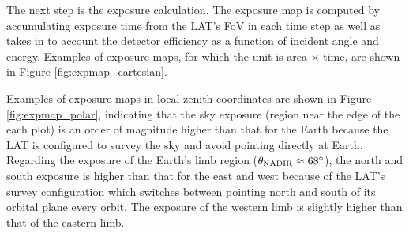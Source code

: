 The next step is the exposure calculation.
The exposure map is computed 
by accumulating exposure time from the LAT's FoV
in each time step as well as takes
in to account the detector efficiency as a function
of incident angle and energy.
Examples of exposure maps, for which the unit is area $\times$ time,
are shown in Figure \ref{fig:expmap_cartesian}.



Examples of exposure maps in local-zenith coordinates are
shown in Figure \ref{fig:expmap_polar}, indicating that the sky exposure
(region near the edge of the each plot) is an order of
magnitude higher than that for the Earth because the LAT
is configured to survey the sky and avoid pointing directly at Earth.
Regarding the exposure of the Earth's limb region
($\theta_{\rm NADIR}\approx68^\circ$), the north and south exposure
is higher than that for the east and west because of the LAT's survey
configuration which switches between pointing north and south of
its orbital plane every orbit. The exposure of the western limb
is slightly higher than that of the eastern limb.

